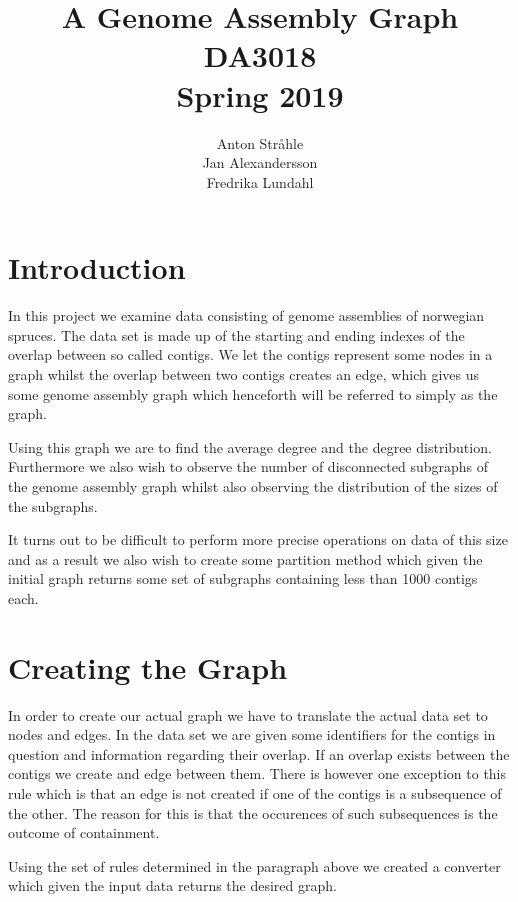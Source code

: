 \documentclass[a4paper,10pt]{article}
\title{A Genome Assembly Graph \\
    \smallskip
    \large{DA3018} \\
    \smallskip
    \large{Spring 2019}}
\author{Anton Stråhle \\ 
    Jan Alexandersson \\
    Fredrika Lundahl}
\date{}
\begin{document}
\maketitle

\section{Introduction}

In this project we examine data consisting of genome assemblies of norwegian spruces. The data set is made up of the starting and ending indexes of the overlap between so called contigs. We let the contigs represent some nodes in a graph whilst the overlap between two contigs creates an edge, which gives us some genome assembly graph which henceforth will be referred to simply as the graph. 

\medskip

Using this graph we are to find the average degree and the degree distribution. Furthermore we also wish to observe the number of disconnected subgraphs of the genome assembly graph whilst also observing the distribution of the sizes of the subgraphs. 

\medskip

It turns out to be difficult to perform more precise operations on data of this size and as a result we also wish to create some partition method which given the initial graph returns some set of subgraphs containing less than 1000 contigs each. 

\section{Creating the Graph}

In order to create our actual graph we have to translate the actual data set to nodes and edges. In the data set we are given some identifiers for the contigs in question and information regarding their overlap. If an overlap exists between the contigs we create and edge between them. There is however one exception to this rule which is that an edge is not created if one of the contigs is a subsequence of the other. The reason for this is that the occurences of such subsequences is the outcome of containment.

\medskip

Using the set of rules determined in the paragraph above we created a converter which given the input data returns the desired graph. 

\medskip
\end{document}
